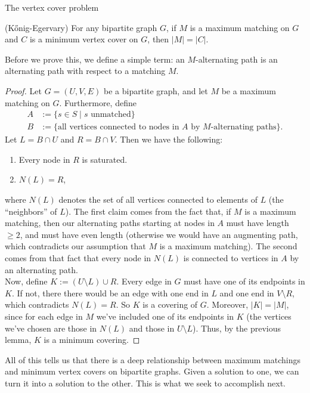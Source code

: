 \begin{section}{The vertex cover problem}
	\begin{theorem}{(K\H{o}nig-Egervary)}
		For any bipartite graph $G$, if $M$ is a maximum matching on $G$ and $C$ is a minimum 
		vertex cover  on $G$, then $|M| = |C|$.
	\end{theorem}
	Before we prove this, we define a simple term: an $M$-alternating path is an alternating path 
	with respect to a matching $M$.
	\begin{proof}
		Let $G=(U,V,E)$ be a bipartite graph, and let $M$ be a maximum matching on $G$. 
		Furthermore, define
		\begin{align}
			A &:= \{s\in S\; |\; s \text{ unmatched}\}\\
			B &:= \{\text{all vertices connected to nodes in $A$ by $M$-alternating paths}\}.
		\end{align}
		Let $L = B\cap U$ and $R = B\cap V$. Then we have the following:
		\begin{enumerate}
			\item Every node in $R$ is saturated.
			\item $N(L) = R$,
		\end{enumerate}
		where $N(L)$ denotes the set of all vertices connected to elements of $L$ (the 
		``neighbors'' of $L$). The first claim comes from the fact that, if $M$ is a 
		maximum matching, then our alternating paths starting at nodes in $A$ must have 
		length $\geq 2$, and must have even length (otherwise we would have an augmenting path, 
		which contradicts our assumption that $M$ is a maximum matching).
		The second comes from that fact that every node in $N(L)$ is connected to vertices in 
		$A$ by an alternating path. \\
		Now, define $K := (U\setminus L)\cup R$. Every edge 
		in $G$ must have one of its endpoints in $K$. If not, there there would be an 
		edge with one end in $L$ and one end in $V\setminus R$, which contradicts 
		$N(L) = R$. So $K$ is a covering of $G$. Moreover, $|K| = |M|$, since for each 
		edge in $M$ we've included one of its endpoints in $K$ (the vertices we've chosen are 
		those in $N(L)$ and those in $U\setminus L$). Thus, by the previous lemma, $K$ is 
		a minimum covering.
	\end{proof}
	All of this tells us that there is a deep relationship between maximum matchings and 
	minimum vertex covers on bipartite graphs. Given a solution to one, we can turn it into a 
	solution to the other. This is what we seek to accomplish next. 
\end{section}

